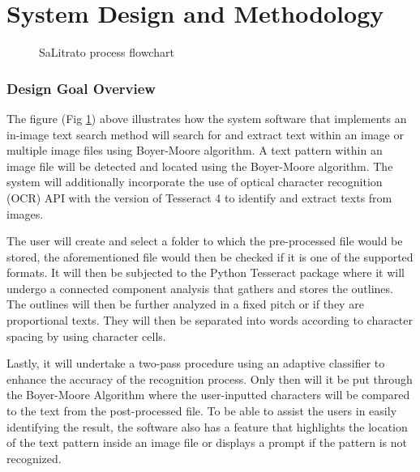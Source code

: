 \part{System Design and Methodology}


\begin{figure}[hbt!]
	\center
	\noindent{}
	\caption{SaLitrato process flowchart}
	\label{fig:salitrato_flowchart}
\end{figure}

\section*{Design Goal Overview}

\hspace\parindent
The figure (Fig \ref{fig:salitrato_flowchart}) above illustrates how the system software that
implements an in-image text search method will search for and extract text within an image or
multiple image files using Boyer-Moore algorithm. A text pattern within an image file will be
detected and located using the Boyer-Moore algorithm. The system will additionally incorporate the
use of optical character recognition (OCR) API with the version of Tesseract 4 to identify and
extract texts from images.

\hfill

The user will create and select a folder to which the pre-processed file would be stored, the
aforementioned file would then be checked if it is one of the supported formats. It will then be
subjected to the Python Tesseract package where it will undergo a connected component analysis that
gathers and stores the outlines. The outlines will then be further analyzed in a fixed pitch or if
they are proportional texts. They will then be separated into words according to character spacing
by using character cells.

\hfill

Lastly, it will undertake a two-pass procedure using an adaptive classifier to enhance the accuracy
of the recognition process. Only then will it be put through the Boyer-Moore Algorithm where the
user-inputted characters will be compared to the text from the post-processed file. To be able to
assist the users in easily identifying the result, the software also has a feature that highlights
the location of the text pattern inside an image file or displays a prompt if the pattern is not
recognized.

